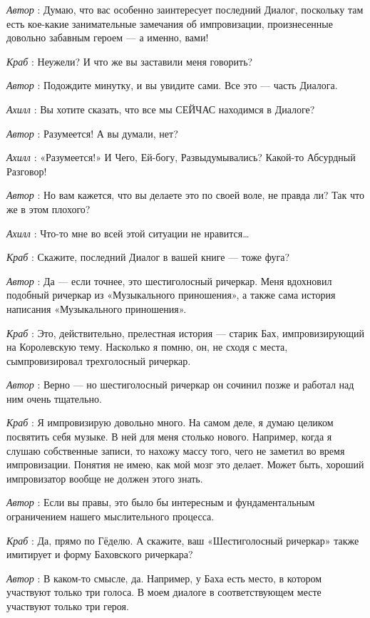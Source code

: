 \documentclass[../main.tex]{subfiles}
\begin{document}
\begin{dialogue}
\emph{Автор} : Думаю, что вас особенно заинтересует последний Диалог, поскольку там есть кое-какие занимательные замечания об импровизации, произнесенные довольно забавным героем --- а именно, вами!

\emph{Краб} : Неужели? И что же вы заставили меня говорить?

\emph{Автор} : Подождите минутку, и вы увидите сами. Все это --- часть Диалога.

\emph{Ахилл} : Вы хотите сказать, что все мы СЕЙЧАС находимся в Диалоге?

\emph{Автор} : Разумеется! А вы думали, нет?

\emph{Ахилл} : «Разумеется!» И Чего, Ей-богу, Развыдумывались? Какой-то Абсурдный Разговор!

\emph{Автор} : Но вам кажется, что вы делаете это по своей воле, не правда ли? Так что же в этом плохого?

\emph{Ахилл} : Что-то мне во всей этой ситуации не нравится\ldots{}

\emph{Краб} : Скажите, последний Диалог в вашей книге --- тоже фуга?

\emph{Автор} : Да --- если точнее, это шестиголосный ричеркар. Меня вдохновил подобный ричеркар из «Музыкального приношения», а также сама история написания «Музыкального приношения».

\emph{Краб} : Это, действительно, прелестная история --- старик Бах, импровизирующий на Королевскую тему. Насколько я помню, он, не сходя с места, сымпровизировал трехголосный ричеркар.

\emph{Автор} : Верно --- но шестиголосный ричеркар он сочинил позже и работал над ним очень тщательно.

\emph{Краб} : Я импровизирую довольно много. На самом деле, я думаю целиком посвятить себя музыке. В ней для меня столько нового. Например, когда я слушаю собственные записи, то нахожу массу того, чего не заметил во время импровизации. Понятия не имею, как мой мозг это делает. Может быть, хороший импровизатор вообще не должен этого знать.

\emph{Автор} : Если вы правы, это было бы интересным и фундаментальным ограничением нашего мыслительного процесса.

\emph{Краб} : Да, прямо по Гёделю. А скажите, ваш «Шестиголосный ричеркар» также имитирует и форму Баховского ричеркара?

\emph{Автор} : В каком-то смысле, да. Например, у Баха есть место, в котором участвуют только три голоса. В моем диалоге в соответствующем месте участвуют только три героя.


\end{dialogue}
\end{document}
